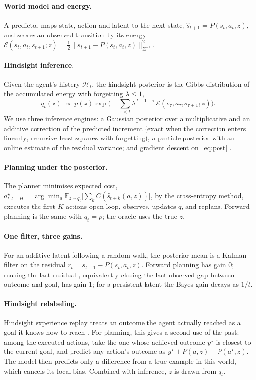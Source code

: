 \documentclass[11pt]{article}
\newcommand{\E}{\mathcal{E}}
\begin{document}
\paragraph{World model and energy.} A predictor maps state, action and latent to the next state,
$\hat s_{t+1}=P(s_t,a_t,z)$, and scores an observed transition by its energy
$\E(s_t,a_t,s_{t+1};z)=\tfrac12\|s_{t+1}-P(s_t,a_t,z)\|^2_{\Sigma^{-1}}$.

\paragraph{Hindsight inference.} Given the agent's history $\mathcal H_t$, the hindsight posterior is the Gibbs
distribution of the accumulated energy with forgetting $\lambda\le1$,
\begin{equation}
q_t(z)\;\propto\;p(z)\exp\Big(-\textstyle\sum_{\tau<t}\lambda^{\,t-1-\tau}\,\E(s_\tau,a_\tau,s_{\tau+1};z)\Big).
\label{eq:post}
\end{equation}
We use three inference engines: a Gaussian posterior over a multiplicative and an additive correction of the
predicted increment (exact when the correction enters linearly; recursive least squares with forgetting); a particle
posterior with an online estimate of the residual variance; and gradient descent on~\eqref{eq:post}
\citep{t2z_2610_22364}.

\paragraph{Planning under the posterior.} The planner minimises expected cost,
$a^\star_{t:t+H}=\arg\min_a\mathbb E_{z\sim q_t}\big[\sum_k C(\hat s_{t+k}(a,z))\big]$, by the cross-entropy method,
executes the first $K$ actions open-loop, observes, updates $q$, and replans. Forward planning is the same with
$q_t=p$; the oracle uses the true $z$.

\paragraph{One filter, three gains.} For an additive latent following a random walk, the posterior mean is a Kalman
filter on the residual $r_t=s_{t+1}-P(s_t,a_t,\bar z)$. Forward planning has gain $0$; reusing the last residual
\citep{cwm_2611_24778}, equivalently closing the last observed gap between outcome and goal, has gain $1$; for a
persistent latent the Bayes gain decays as $1/t$.

\paragraph{Hindsight relabeling.} Hindsight experience replay treats an outcome the agent actually reached as a goal
it knows how to reach \citep{andrychowicz2017her}. For planning, this gives a second use of the past: among the
executed actions, take the one whose achieved outcome $y^\star$ is closest to the current goal, and predict any action's
outcome as $y^\star+P(a,z)-P(a^\star,z)$. The model then predicts only a difference from a true example in this world,
which cancels its local bias. Combined with inference, $z$ is drawn from $q_t$.
\end{document}

